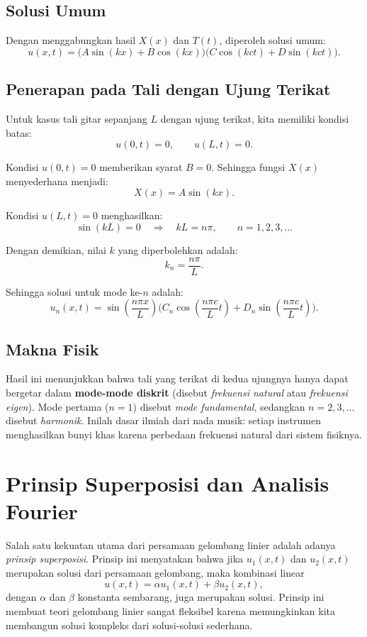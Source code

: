 \documentclass{bukumjh}
\begin{document}
\subsection*{Solusi Umum}
Dengan menggabungkan hasil $X(x)$ dan $T(t)$, diperoleh solusi umum:
\[
u(x,t) = \big( A \sin(kx) + B \cos(kx) \big) \big( C \cos(kct) + D \sin(kct) \big).
\]

\subsection*{Penerapan pada Tali dengan Ujung Terikat}
Untuk kasus tali gitar sepanjang $L$ dengan ujung terikat, kita memiliki kondisi batas:
\[
u(0,t) = 0, \qquad u(L,t) = 0.
\]

Kondisi $u(0,t)=0$ memberikan syarat $B=0$. 
Sehingga fungsi $X(x)$ menyederhana menjadi:
\[
X(x) = A \sin(kx).
\]

Kondisi $u(L,t)=0$ menghasilkan:
\[
\sin(kL) = 0 \quad \Rightarrow \quad kL = n\pi, \qquad n = 1,2,3,\dots
\]

Dengan demikian, nilai $k$ yang diperbolehkan adalah:
\[
k_n = \frac{n\pi}{L}.
\]

Sehingga solusi untuk mode ke-$n$ adalah:
\[
u_n(x,t) = \sin\left(\frac{n\pi x}{L}\right) \Big( C_n \cos\left(\frac{n\pi c}{L} t\right) + D_n \sin\left(\frac{n\pi c}{L} t\right) \Big).
\]

\subsection*{Makna Fisik}
Hasil ini menunjukkan bahwa tali yang terikat di kedua ujungnya hanya dapat bergetar dalam \textbf{mode-mode diskrit} (disebut \emph{frekuensi natural} atau \emph{frekuensi eigen}). 
Mode pertama ($n=1$) disebut \emph{mode fundamental}, sedangkan $n=2,3,\dots$ disebut \emph{harmonik}. 
Inilah dasar ilmiah dari nada musik: setiap instrumen menghasilkan bunyi khas karena perbedaan frekuensi natural dari sistem fisiknya.

\section{Prinsip Superposisi dan Analisis Fourier}

Salah satu kekuatan utama dari persamaan gelombang linier adalah adanya \emph{prinsip superposisi}. 
Prinsip ini menyatakan bahwa jika $u_1(x,t)$ dan $u_2(x,t)$ merupakan solusi dari persamaan gelombang, maka kombinasi linear
\[
u(x,t) = \alpha u_1(x,t) + \beta u_2(x,t),
\]
dengan $\alpha$ dan $\beta$ konstanta sembarang, juga merupakan solusi. 
Prinsip ini membuat teori gelombang linier sangat fleksibel karena memungkinkan kita membangun solusi kompleks dari solusi-solusi sederhana.
\end{document}
